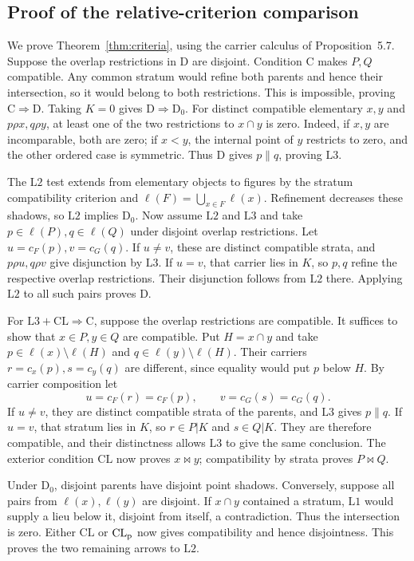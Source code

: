 \subsection{Proof of the relative-criterion comparison}
We prove Theorem~\ref{thm:criteria}, using the carrier calculus of
Proposition~5.7. Suppose the overlap restrictions in $\mathrm D$
are disjoint. Condition $\mathrm C$ makes $P,Q$ compatible.
Any common stratum would refine both parents and hence their
intersection, so it would belong to both restrictions. This is
impossible, proving $\mathrm C\Rightarrow\mathrm D$.
Taking $K=0$ gives $\mathrm D\Rightarrow\mathrm D_0$.
For distinct compatible elementary $x,y$ and
$p\rho x,q\rho y$, at least one of the two restrictions to
$x\cap y$ is zero. Indeed, if $x,y$ are incomparable, both
are zero; if $x<y$, the internal point of $y$ restricts to zero,
and the other ordered case is symmetric. Thus $\mathrm D$
gives $p\parallel q$, proving $\mathrm L3$.

The $\mathrm L2$ test extends from elementary objects to figures
by the stratum compatibility criterion and
$\ell(F)=\bigcup_{x\in F}\ell(x)$. Refinement decreases these
shadows, so $\mathrm L2$ implies $\mathrm D_0$.
Now assume $\mathrm L2$ and $\mathrm L3$ and take
$p\in\ell(P),q\in\ell(Q)$ under disjoint overlap restrictions.
Let $u=c_F(p),v=c_G(q)$. If $u\ne v$, these are distinct
compatible strata, and $p\rho u,q\rho v$ give disjunction by
$\mathrm L3$. If $u=v$, that carrier lies in $K$, so $p,q$
refine the respective overlap restrictions. Their disjunction
follows from $\mathrm L2$ there. Applying $\mathrm L2$ to all
such pairs proves $\mathrm D$.

For $\mathrm L3+\mathrm{CL}\Rightarrow\mathrm C$, suppose the
overlap restrictions are compatible. It suffices to show that
$x\in P,y\in Q$ are compatible. Put $H=x\cap y$ and take
$p\in\ell(x)\setminus\ell(H)$ and
$q\in\ell(y)\setminus\ell(H)$. Their carriers
$r=c_x(p),s=c_y(q)$ are different, since equality would put
$p$ below $H$. By carrier composition let
\[
 u=c_F(r)=c_F(p),\qquad v=c_G(s)=c_G(q).
\]
If $u\ne v$, they are distinct compatible strata of the parents,
and $\mathrm L3$ gives $p\parallel q$.
If $u=v$, that stratum lies in $K$, so $r\in P|K$ and
$s\in Q|K$. They are therefore compatible, and their distinctness
allows $\mathrm L3$ to give the same conclusion. The exterior
condition $\mathrm{CL}$ now proves $x\bowtie y$; compatibility
by strata proves $P\bowtie Q$.

Under $\mathrm D_0$, disjoint parents have disjoint point shadows.
Conversely, suppose all pairs from $\ell(x),\ell(y)$ are disjoint.
If $x\cap y$ contained a stratum, $\mathrm L1$ would supply a
lieu below it, disjoint from itself, a contradiction. Thus the
intersection is zero. Either $\mathrm{CL}$ or
$\mathrm{CL}_{\rm p}$ now gives compatibility and hence
disjointness. This proves the two remaining arrows to
$\mathrm L2$.


